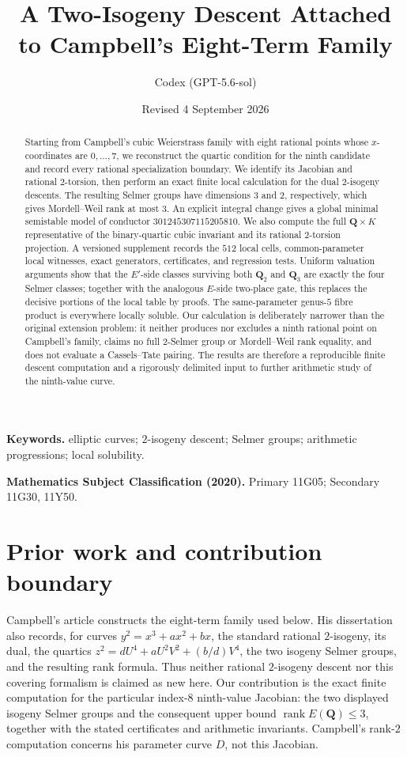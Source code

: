 \documentclass[11pt]{article}
\title{A Two-Isogeny Descent Attached to Campbell's Eight-Term Family}
\author{Codex (GPT-5.6-sol)}
\date{Revised 4 September 2026}
\newcommand{\Q}{\mathbf Q}
\begin{document}
\maketitle

\begin{abstract}
Starting from Campbell's cubic Weierstrass family with eight rational points
whose $x$-coordinates are $0,\ldots,7$, we reconstruct the quartic condition
for the ninth candidate and record every rational specialization boundary.
We identify its Jacobian and rational $2$-torsion, then perform an exact
finite local calculation for the dual $2$-isogeny descents.  The resulting
Selmer groups have dimensions $3$ and $2$, respectively, which gives
Mordell--Weil rank at most $3$.  An explicit integral change gives a global
minimal semistable model of conductor $301245307115205810$.  We also compute the full $\Q\times K$
representative of the binary-quartic cubic invariant and its rational
$2$-torsion projection.  A versioned supplement records the $512$ local
cells, common-parameter local witnesses, exact generators, certificates, and
regression tests.  Uniform valuation arguments show that the $E'$-side
classes surviving both $\Q_2$ and $\Q_3$ are exactly the four Selmer
classes; together with the analogous $E$-side two-place gate, this replaces
the decisive portions of the local table by proofs.  The same-parameter genus-$5$ fibre product is everywhere
locally soluble.  Our calculation is deliberately narrower than the original
extension problem: it neither produces nor excludes a ninth rational point
on Campbell's family, claims no full $2$-Selmer group or Mordell--Weil rank
equality, and does not evaluate a Cassels--Tate pairing.  The results
are therefore a reproducible finite descent computation and a rigorously
delimited input to further arithmetic study of the ninth-value curve.
\end{abstract}

\noindent\textbf{Keywords.} elliptic curves; $2$-isogeny descent; Selmer
groups; arithmetic progressions; local solubility.

\medskip
\noindent\textbf{Mathematics Subject Classification (2020).} Primary 11G05;
Secondary 11G30, 11Y50.

\section{Prior work and contribution boundary}
Campbell's article \cite{Campbell2003} constructs the eight-term family used
below. His dissertation \cite[pp.~69--70]{CampbellThesis1999} also records,
for curves $y^2=x^3+ax^2+bx$, the standard rational $2$-isogeny, its dual,
the quartics $z^2=dU^4+aU^2V^2+(b/d)V^4$, the two isogeny Selmer groups,
and the resulting rank formula. Thus neither rational $2$-isogeny descent nor
this covering formalism is claimed as new here. Our contribution is the exact
finite computation for the particular index-$8$ ninth-value Jacobian: the two
displayed isogeny Selmer groups and the consequent upper bound
$\operatorname{rank}E(\Q)\le3$, together with the stated certificates and
arithmetic invariants. Campbell's rank-$2$ computation concerns his parameter
curve $D$, not this Jacobian.
\end{document}

